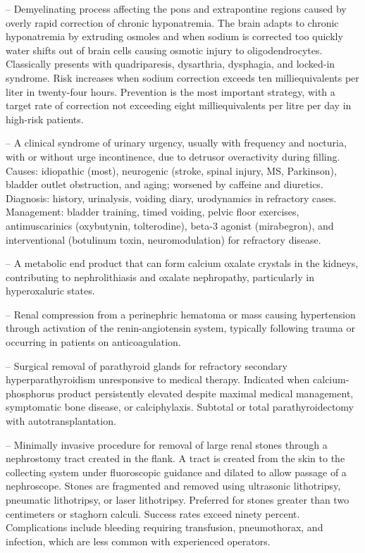 -- Demyelinating process affecting the pons and extrapontine regions caused by overly rapid correction of chronic hyponatremia. The brain adapts to chronic hyponatremia by extruding osmoles and when sodium is corrected too quickly water shifts out of brain cells causing osmotic injury to oligodendrocytes. Classically presents with quadriparesis, dysarthria, dysphagia, and locked-in syndrome. Risk increases when sodium correction exceeds ten milliequivalents per liter in twenty-four hours. Prevention is the most important strategy, with a target rate of correction not exceeding eight milliequivalents per litre per day in high-risk patients.

-- A clinical syndrome of urinary urgency, usually with frequency and nocturia, with or without urge incontinence, due to detrusor overactivity during filling. Causes: idiopathic (most), neurogenic (stroke, spinal injury, MS, Parkinson), bladder outlet obstruction, and aging; worsened by caffeine and diuretics. Diagnosis: history, urinalysis, voiding diary, urodynamics in refractory cases. Management: bladder training, timed voiding, pelvic floor exercises, antimuscarinics (oxybutynin, tolterodine), beta-3 agonist (mirabegron), and interventional (botulinum toxin, neuromodulation) for refractory disease.

-- A metabolic end product that can form calcium oxalate crystals in the kidneys, contributing to nephrolithiasis and oxalate nephropathy, particularly in hyperoxaluric states.

-- Renal compression from a perinephric hematoma or mass causing hypertension through activation of the renin-angiotensin system, typically following trauma or occurring in patients on anticoagulation.

-- Surgical removal of parathyroid glands for refractory secondary hyperparathyroidism unresponsive to medical therapy. Indicated when calcium-phosphorus product persistently elevated despite maximal medical management, symptomatic bone disease, or calciphylaxis. Subtotal or total parathyroidectomy with autotransplantation.

-- Minimally invasive procedure for removal of large renal stones through a nephrostomy tract created in the flank. A tract is created from the skin to the collecting system under fluoroscopic guidance and dilated to allow passage of a nephroscope. Stones are fragmented and removed using ultrasonic lithotripsy, pneumatic lithotripsy, or laser lithotripsy. Preferred for stones greater than two centimeters or staghorn calculi. Success rates exceed ninety percent. Complications include bleeding requiring transfusion, pneumothorax, and infection, which are less common with experienced operators.

